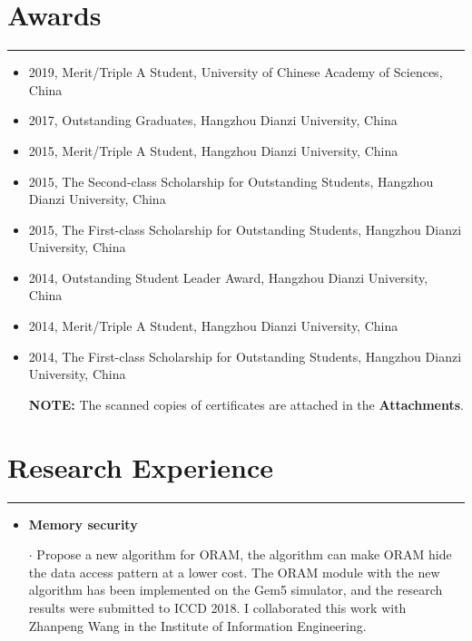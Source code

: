 \documentclass[11pt]{article}
\begin{document}
\section*{Awards}
\vspace{-0.6cm}
\rule[0.1pt]{\textwidth}{1pt}
\begin{itemize}
	\item 2019, Merit/Triple A Student, University of Chinese Academy of Sciences, China
	\item 2017, Outstanding Graduates, Hangzhou Dianzi University, China
	\item 2015, Merit/Triple A Student, Hangzhou Dianzi University, China
	\item 2015, The Second-class Scholarship for Outstanding Students, Hangzhou Dianzi University, China
	\item 2015, The First-class Scholarship for Outstanding Students, Hangzhou Dianzi University, China
	\item 2014, Outstanding Student Leader Award, Hangzhou Dianzi University, China
	\item 2014, Merit/Triple A Student, Hangzhou Dianzi University, China
	\item 2014, The First-class Scholarship for Outstanding Students, Hangzhou Dianzi University, China
	
	{\bf NOTE:} The scanned copies of certificates are attached in the \textbf{Attachments}.
\end{itemize}


\section*{Research Experience}
\vspace{-0.6cm}
\rule[0.1pt]{\textwidth}{1pt}
\begin{itemize}

\item {\bf Memory security}\\
\vspace{-.3cm}

$\cdot$ Propose a new algorithm for ORAM, the algorithm can make ORAM hide the data access pattern at a lower cost. The ORAM module with the new algorithm has been implemented on the Gem5 simulator, and the research results were submitted to ICCD 2018. I collaborated this work with Zhanpeng Wang in the Institute of Information Engineering. 
\end{itemize}
\end{document}
